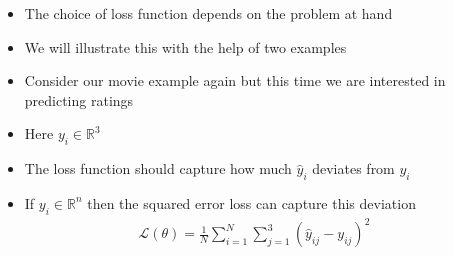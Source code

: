 \begin{frame}
  \begin{columns}
    \begin{overlayarea}{\textwidth}{\textheight}
      \vspace{0.3cm}
    \end{overlayarea}

    \begin{overlayarea}{\textwidth}{\textheight}
      \begin{itemize}[<+->]
      \justifying
        \item The choice of loss function depends on the problem at hand
        \item We will illustrate this with the help of two examples
        \item Consider our movie example again but this time we are interested in predicting ratings
        \item Here $y_i \in \mathbb{R}^3$
        \item The loss function should capture how much $\hat{y}_i$ deviates from $y_i$
        \item If $y_i \in \mathbb{R}^n$ then the squared error loss can capture this deviation
            \vspace{-0.2in}
            \begin{align*}
              \mathscr{L}(\theta) = \frac{1}{N}\sum_{i=1}^{N}\sum_{j=1}^{3}\left(\hat{y}_{ij} - y_{ij}\right)^2
            \end{align*}
      \end{itemize}
    \end{overlayarea}
  \end{columns}
\end{frame}

